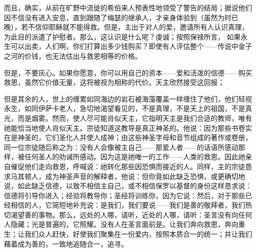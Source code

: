 而且，确实，从前在旷野中流徙的希伯来人预表性地领受了警告的结局；据说他们因不信没有进入安息，直到跟随了梅瑟的继承人，才亲身体验到（虽然为时已晚），若不信仰耶稣就不能得救。但是，主出于对人的爱，邀请所有人认识真理，为此目的派遣了护慰者。那么，这认识是什么呢？虔诚；按照保禄所言， 如果永生可以出卖，人们啊，你们打算出多少钱购买？即使有人评估整个——传说中金子之河的价钱，也无法估出与救恩相等的价格。\par

但是，不要灰心。如果你愿意，你可以用自己的资本——爱和活泼的信德——购买救恩，虽然它价值无量，这将被视为相称的代价。天主欣然接受这回报；\par

但是其余的人，世上的缠累如同海边的岩石被海藻覆盖一样缠住了他们，他们轻视永生，如同伊萨卡老人，急切地渴望看见的，不是真理，不是天上的祖国，不是真光，而是烟雾。然而，使人尽可能肖似天主，它指明天主是我们合适的教师，唯有祂能恰当地使人肖似天主。宗徒知道这教导是真正神圣的。他说：因为那些书卷实在是神圣的，它们圣化人并使人成神；由这些神圣字母和音节组成的著作或卷册，同一位宗徒随后称之为：没有人会像被主自己——那爱人者——的话语所感动那样，被任何圣人的劝诫所感动。因为这是祂唯一的工作——人类的救恩。因此祂亲自催促他们走向救恩，呼喊说：祂转化那些因恐惧而接近的人。同样，主的宗徒恳求马其顿人，成为神圣声音的解释者，他说：但你竟如此缺乏恐惧，或更确切地说，如此缺乏信德，以致不相信主自己，或不相信保罗以基督的身份这样恳求说：信德将引导你进入；经验将教导你；圣经将训练你，因为它说：然后，对于那些已经相信的人，它简短地补充说：是我们，我们要说——我们是善的敬拜者，我们热切渴望善的事物。那么，远处的人哪，请听，近处的人哪，请听：圣言没有向任何人隐藏；光是普遍的，它照耀。没有人在圣言面前是。让我们奔向救恩，奔向重生；让我们众人赶快，好使我们聚集在一份爱内，按照本质合一的统一；并让我们藉着成为善的，一致地追随合一，追寻。\par

